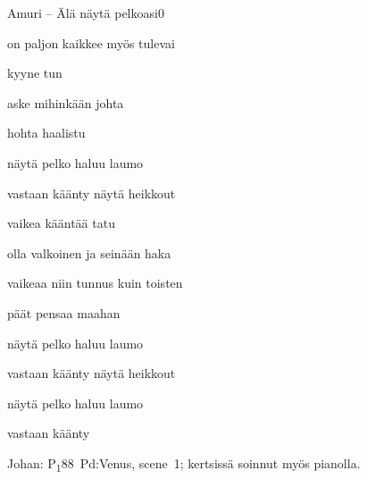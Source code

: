 \documentclass[12pt,a4paper]{article}
\begin{document}
\thispagestyle{empty}
\begin{mysong}{Amuri – Älä näytä pelkoasi}{0}


\begin{SBVerse}
   on paljon kaikkee   myös
  tulevai

   kyyne  tun

   aske  mihinkään
  johta

   hohta 
  haalistu
\end{SBVerse}

\begin{SBChorus}
   näytä pelko  haluu laumo

   vastaan käänty  näytä
  heikkout
\end{SBChorus}


\begin{SBVerse}
   vaikea kääntää  
  tatu

   olla valkoinen ja   seinään
  haka

   vaikeaa niin tunnus  kuin toisten

   päät pensaa  maahan
\end{SBVerse}

\begin{SBChorus}
   näytä pelko  haluu laumo

   vastaan käänty  näytä
  heikkout

   näytä pelko  haluu laumo

   vastaan käänty
\end{SBChorus}


{\SBLyricNoteFont Johan: P\textsubscript{1}88~Pd:Venus, scene~1; kertsissä
soinnut myös pianolla.}

\end{mysong}
\end{document}
